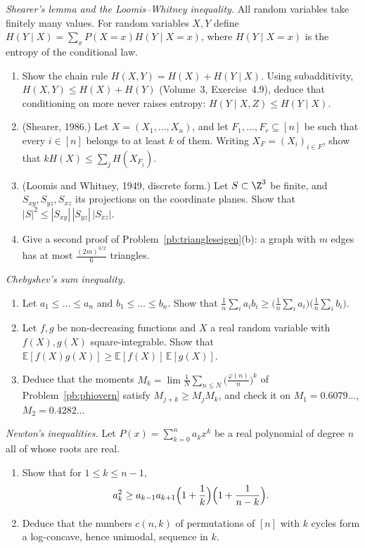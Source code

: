 \begin{exercise}[Journey]\label{pb:shearer}
\emph{Shearer's lemma and the Loomis--Whitney inequality.} All random variables take finitely many values. For random variables
$X,Y$ define $H(Y\mid X)=\sum_xP(X=x)H(Y\mid X=x)$, where $H(Y\mid X=x)$ is the entropy of the conditional law.
\begin{enumerate}[label=(\alph*)]
\item Show the chain rule $H(X,Y)=H(X)+H(Y\mid X)$. Using subadditivity, $H(X,Y)\le H(X)+H(Y)$ (Volume~3, Exercise~4.9), deduce that
conditioning on more never raises entropy: $H(Y\mid X,Z)\le H(Y\mid X)$.
\item (Shearer, 1986.) Let $X=(X_1,\dots,X_n)$, and let $F_1,\dots,F_r\subseteq[n]$ be such that every $i\in[n]$ belongs to at least $k$ of them.
Writing $X_F=(X_i)_{i\in F}$, show that $kH(X)\le\sum_jH(X_{F_j})$.
\item (Loomis and Whitney, 1949, discrete form.) Let $S\subset\Z^3$ be finite, and $S_{xy},S_{yz},S_{xz}$ its projections on the coordinate
planes. Show that $|S|^2\le|S_{xy}|\,|S_{yz}|\,|S_{xz}|$.
\item Give a second proof of Problem~\ref{pb:triangleseigen}(b): a graph with $m$ edges has at most $\frac{(2m)^{3/2}}6$ triangles.
\end{enumerate}
\end{exercise}

\begin{exercise}[$\star$]\label{pb:chebyshevsum}
\emph{Chebyshev's sum inequality.}
\begin{enumerate}[label=(\alph*)]
\item Let $a_1\le\dots\le a_n$ and $b_1\le\dots\le b_n$. Show that $\frac1n\sum_ia_ib_i\ge\bigl(\frac1n\sum_ia_i\bigr)\bigl(\frac1n\sum_ib_i\bigr)$.
\item Let $f,g$ be non-decreasing functions and $X$ a real random variable with $f(X),g(X)$ square-integrable. Show that
$\mathbb E[f(X)g(X)]\ge\mathbb E[f(X)]\,\mathbb E[g(X)]$.
\item Deduce that the moments $M_k=\lim\frac1N\sum_{n\le N}\bigl(\frac{\varphi(n)}n\bigr)^k$ of Problem~\ref{pb:phiovern} satisfy
$M_{j+k}\ge M_jM_k$, and check it on $M_1=0.6079\ldots$, $M_2=0.4282\ldots$
\end{enumerate}
\end{exercise}

\begin{exercise}[$\star\star$]\label{pb:newton}
\emph{Newton's inequalities.} Let $P(x)=\sum_{k=0}^na_kx^k$ be a real polynomial of degree $n$ all of whose roots are real.
\begin{enumerate}[label=(\alph*)]
\item Show that for $1\le k\le n-1$,
\[
a_k^2\ge a_{k-1}a_{k+1}\Bigl(1+\frac1k\Bigr)\Bigl(1+\frac1{n-k}\Bigr).
\]
\item Deduce that the numbers $c(n,k)$ of permutations of $[n]$ with $k$ cycles form a log-concave, hence unimodal, sequence in $k$.
\end{enumerate}
\end{exercise}

